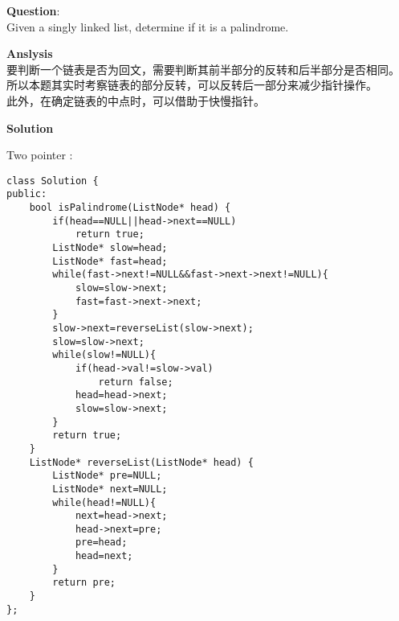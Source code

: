     
\begin{description}
    \item{\textbf{Question}}:\\%
		Given a singly linked list, determine if it is a palindrome.

    \item{\textbf{Anslysis}}\\
		要判断一个链表是否为回文，需要判断其前半部分的反转和后半部分是否相同。\\
		所以本题其实时考察链表的部分反转，可以反转后一部分来减少指针操作。\\
		此外，在确定链表的中点时，可以借助于快慢指针。

    \item{\textbf{Solution}}
	\item{Two pointer} : \\
		\begin{lstlisting}
class Solution {
public:
    bool isPalindrome(ListNode* head) {
        if(head==NULL||head->next==NULL)
            return true;
        ListNode* slow=head;
        ListNode* fast=head;
        while(fast->next!=NULL&&fast->next->next!=NULL){
            slow=slow->next;
            fast=fast->next->next;
        }
        slow->next=reverseList(slow->next);
        slow=slow->next;
        while(slow!=NULL){
            if(head->val!=slow->val)
                return false;
            head=head->next;
            slow=slow->next;
        }
        return true;
    }
    ListNode* reverseList(ListNode* head) {
        ListNode* pre=NULL;
        ListNode* next=NULL;
        while(head!=NULL){
            next=head->next;
            head->next=pre;
            pre=head;
            head=next;
        }
        return pre;
    }
};
		\end{lstlisting}

\end{description}

